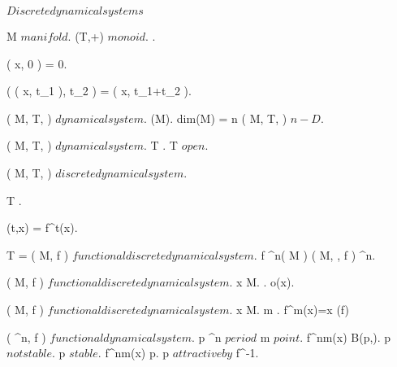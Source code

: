 \documentclass[../Main/main]{subfiles}
\begin{document}
\unit{ $ Discrete dynamical systems $ }
{	
	
	{
		{
			M $ manifold $.
			(T,+) $ monoid $.
			.
		}
		{
			{
				\phi( x, 0 ) = 0.

				{
					\phi( \phi( x, t_1 ), t_2 ) = \phi( x, t_1+t_2 ).
				}
			}
		}
	}


	{
		{
			( M, T, \phi ) $ dynamical system $.
		}
		{
			\dim(M).
		}
		\denote
		{
			dim(M) = n \as ( M, T, \phi ) $ n-D $.
		}
	}

	{
		{
			( M, T, \phi ) $ dynamical system $.
		}
		{
			T \countable.
		}
		{
			T \subset \R $ open $.
		}
	}


	{
		{
			( M, T, \phi ) $ discrete dynamical system $.
		}
		{
			T \subset \N.

			{
				{
					\phi(t,x) = f^t(x).
				}
			}
		}
		\denote
		{
			T = \N \as ( M, f ) $ functional discrete dynamical system $.
			f \in \Cc^n( M ) \as ( M, \N, f ) \s \Cc^n.
		}
	}
	
	
	{
		{
			( M, f ) $ functional discrete dynamical system $.
			x \in M.
		}
		{
			.
		}
		\denote
		{
			o(x).
		}
	}
	
	
	{
		{
			( M, f ) $ functional discrete dynamical system $.
			x \in M.
			m \in \N.
		}
		{
			f^m(x)=x
		}
		\denote
		{
			 \as \fixed(f)
		}
	}


	{
		{
			( \R^n, f ) $ functional dynamical system $.
			p \in \R^n $ period $ m $ point $.
		}
		{
			\all{ \epsilon \in \R^+ }
			{
				\ex{ \delta \in \R^+ }
				{
					{
						{
							f^{nm}(x) \in B(p,\epsilon).
						}
					}
				}
			}
		}
		{
			p $ not stable $.
		}
		{
			p $ stable $.
			\ex{ \epsilon \in \R^+ }
			{
				{
					f^{nm}(x) \convergesto p.
				}
			}
		}
		{
			p $ attractive by $ f^{-1}.
		}
	}
	
}
\end{document}
